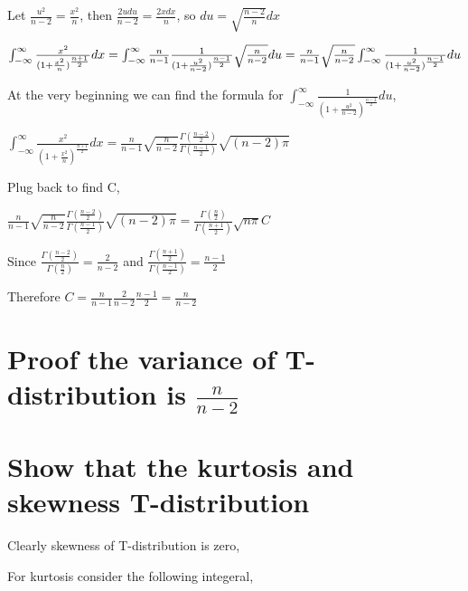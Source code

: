 \documentclass[20pt]{article}
\begin{document}
{\fontsize{20}{20}\selectfont 
 Let $\frac{u^2}{n-2} = \frac{x^2}{n}$, then $\frac{2udu}{n-2} = \frac{2xdx}{n} $, so $du = \sqrt{\frac{n-2}{n}}dx$ }

{\fontsize{20}{20}\selectfont 
$\int_{-\infty}^{\infty}{  \frac{x^2}{(1+\frac{x^2}{n})^{\frac{n+1}{2}}}}dx \\ = \int_{-\infty}^{\infty} \frac{n}{n-1} \frac{1}{(1+\frac{u^2}{n-2})^{\frac{n-1}{2}}} \sqrt{\frac{n}{n-2}} du \\ = \frac{n}{n-1} \sqrt{\frac{n}{n-2}}  \int_{-\infty}^{\infty}  \frac{1}{(1+\frac{u^2}{n-2})^{\frac{n-1}{2}}}du $}


{\fontsize{10}{10}\selectfont At the very beginning we can find the formula for $\int_{-\infty}^{\infty}  \frac{1}{(1+\frac{u^2}{n-2})^{\frac{n-2}{2}}}du$,}

{\fontsize{20}{20}\selectfont 
$\int_{-\infty}^{\infty}{  \frac{x^2}{(1+\frac{x^2}{n})^{\frac{n+1}{2}}}}dx  = \frac{n}{n-1} \sqrt{\frac{n}{n-2}}  \frac{\Gamma({\frac{n-2}{2}})}{\Gamma({\frac{n-1}{2}})}  \sqrt{(n-2)\pi} $}

{\fontsize{10}{10}\selectfont Plug back to find C,}

{\fontsize{20}{20}\selectfont 
$\frac{n}{n-1} \sqrt{\frac{n}{n-2}}  \frac{\Gamma({\frac{n-2}{2}})}{\Gamma({\frac{n-1}{2}})}  \sqrt{(n-2)\pi} =  \frac{\Gamma({\frac{n}{2}})}{\Gamma({\frac{n+1}{2}})}  \sqrt{n\pi} C$}

{\fontsize{20}{20}\selectfont 
Since $\frac{\Gamma({\frac{n-2}{2}})}{\Gamma({\frac{n}{2}})} = \frac{2}{n-2}$ and $\frac{\Gamma({\frac{n+1}{2}})}{\Gamma({\frac{n-1}{2}})} = \frac{n-1}{2}$}

{\fontsize{20}{20}\selectfont 
Therefore $C = \frac{n}{n-1} \frac{2}{n-2} \frac{n-1}{2} = \frac{n}{n-2}$}


\section{Proof the variance of T-distribution is $\frac{n}{n-2}$}

\section{Show that the kurtosis and skewness T-distribution }

{\fontsize{10}{10}\selectfont Clearly skewness of T-distribution is zero,}

{\fontsize{10}{10}\selectfont For kurtosis consider the following integeral,}
\end{document}
